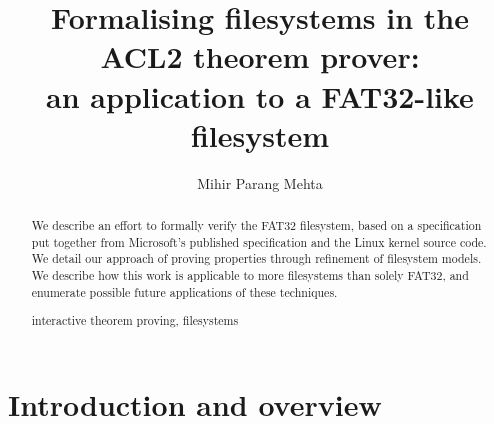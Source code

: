 \documentclass[runningheads,a4paper]{llncs}
\newcommand{\keywords}[1]{\par\addvspace\baselineskip
\noindent\keywordname\enspace\ignorespaces#1}
\begin{document}
\mainmatter  %

\title{Formalising filesystems in the ACL2 theorem prover:\\ an
  application to a FAT32-like filesystem}


%
%
\author{Mihir Parang Mehta}
%


%
%

\maketitle

\begin{abstract}
  We describe an effort to formally verify the FAT32 filesystem, based
  on a specification put together from Microsoft's published
  specification and the Linux kernel source code. We detail our
  approach of proving properties through refinement of filesystem
  models. We describe how this work is applicable to more filesystems
  than solely FAT32, and enumerate possible future applications of
  these techniques.
\keywords{interactive theorem proving, filesystems}
\end{abstract}

\section{Introduction and overview}
\end{document}
